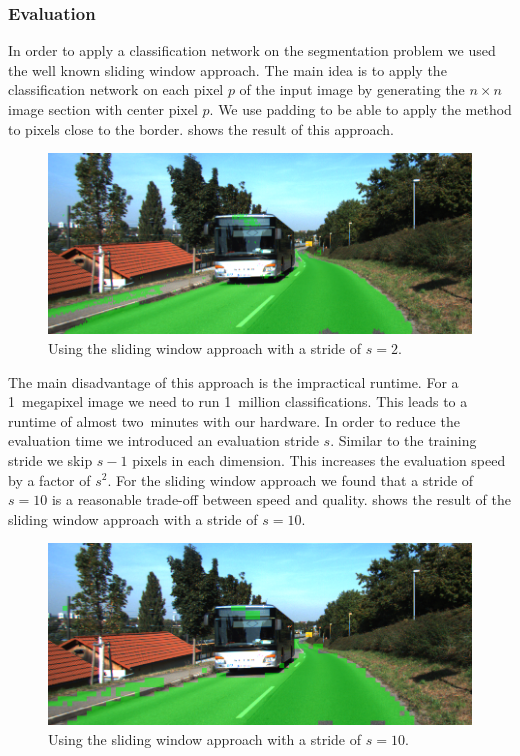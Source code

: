 \subsubsection{Evaluation}
In order to apply a classification network on the segmentation problem we used
the well known sliding window approach. The main idea is to apply the
classification network on each pixel $p$ of the input image by generating the
$n \times n$ image section with center pixel $p$. We use padding to be able to
apply the method to pixels close to the border.  shows the
result of this approach.

\begin{figure}[H]
	\centering
	\includegraphics[width=\columnwidth]{figures/models/testing2-um_32_sliding_stride2.png}
	\caption{Using the sliding window approach with a stride of $s=2$.}
	\label{fig:stride2}
\end{figure}

The main disadvantage of this approach is the impractical runtime. For a
1~megapixel image we need to run 1~million classifications. This leads to a
runtime of almost two~minutes with our hardware. In order to reduce the
evaluation time we introduced an evaluation stride $s$. Similar to the training
stride we skip $s-1$ pixels in each dimension. This increases the evaluation
speed by a factor of $s^2$. For the sliding window approach we found that a
stride of $s = 10$ is a reasonable trade-off between speed and quality.
 shows the result of the sliding window approach with a
stride of $s=10$.



\begin{figure}[H]
	\centering
	\includegraphics[width=\columnwidth]{figures/models/testing2-um_32_sliding_stride10.png}
	\caption{Using the sliding window approach with a stride of $s=10$.}
	\label{fig:stride10}
\end{figure}


